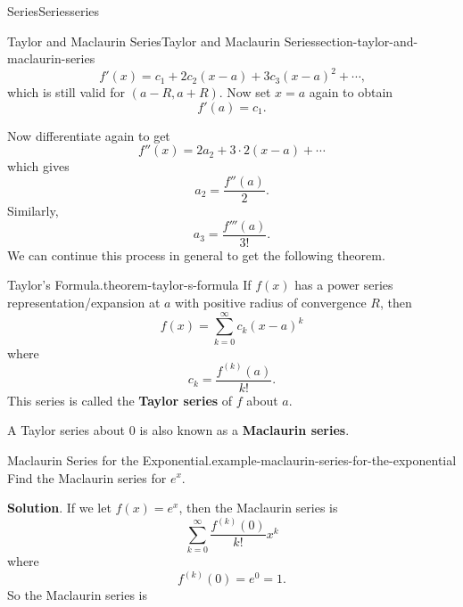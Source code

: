 \documentclass[oneside,10pt,]{book}
\newcommand{\terminology}[1]{\textbf{#1}}
\numberwithin{equation}{section}
\begin{document}
\begin{chapterptx}{Series}{}{Series}{}{}{series}
\begin{sectionptx}{Taylor and Maclaurin Series}{}{Taylor and Maclaurin Series}{}{}{section-taylor-and-maclaurin-series}
\begin{equation*}
f'(x) = c_{1} + 2c_{2}(x - a) + 3c_{3}(x - a)^{2} + \cdots\text{,}
\end{equation*}
which is still valid for \((a - R, a + R)\). Now set \(x = a\) again to obtain%
\begin{equation*}
f'(a) = c_{1}\text{.}
\end{equation*}
%
\par
\hypertarget{p-961}{}%
Now differentiate again to get%
\begin{equation*}
f''(x) = 2a_{2} + 3\cdot2(x - a) + \cdots
\end{equation*}
which gives%
\begin{equation*}
a_{2} = \frac{f''(a)}{2}\text{.}
\end{equation*}
Similarly,%
\begin{equation*}
a_{3} = \frac{f'''(a)}{3!}\text{.}
\end{equation*}
We can continue this process in general to get the following theorem.%
\begin{theorem}{Taylor's Formula.}{}{theorem-taylor-s-formula}%
\hypertarget{p-962}{}%
If \(f(x)\) has a power series representation\slash{}expansion at \(a\) with positive radius of convergence \(R\), then%
\begin{equation*}
f(x) = \sum_{k=0}^{\infty}c_{k}(x - a)^{k}
\end{equation*}
where%
\begin{equation*}
c_{k} = \frac{f^{(k)}(a)}{k!}\text{.}
\end{equation*}
This series is called the \terminology{Taylor series} of \(f\) about \(a\).%
\end{theorem}
\hypertarget{p-963}{}%
A Taylor series about \(0\) is also known as a \terminology{Maclaurin series}.%
\begin{example}{Maclaurin Series for the Exponential.}{example-maclaurin-series-for-the-exponential}%
\hypertarget{p-964}{}%
Find the Maclaurin series for \(e^{x}\).%
\par\smallskip%
\noindent\textbf{Solution}.\hypertarget{solution-195}{}\quad%
\hypertarget{p-965}{}%
If we let \(f(x) = e^{x}\), then the Maclaurin series is%
\begin{equation*}
\sum_{k=0}^{\infty}\frac{f^{(k)}(0)}{k!}x^{k}
\end{equation*}
where%
\begin{equation*}
f^{(k)}(0) = e^{0} = 1\text{.}
\end{equation*}
So the Maclaurin series is%
\begin{equation*}

\end{equation*}
\end{example}
\end{sectionptx}
\end{chapterptx}
\end{document}
